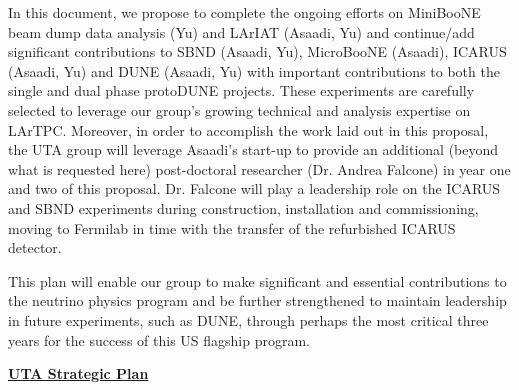In this document, we propose to complete the ongoing efforts on MiniBooNE beam dump data analysis (Yu) and LArIAT (Asaadi, Yu) and continue/add significant contributions to SBND (Asaadi, Yu), MicroBooNE (Asaadi), ICARUS (Asaadi, Yu) and DUNE (Asaadi, Yu) with important contributions to both the single and dual phase protoDUNE projects. These experiments are carefully selected to leverage our group's growing technical and analysis expertise on LArTPC. Moreover, in order to accomplish the work laid out in this proposal, the UTA group will leverage Asaadi's start-up to provide an additional (beyond what is requested here) post-doctoral researcher (Dr. Andrea Falcone) in year one and two of this proposal. Dr. Falcone will play a leadership role on the ICARUS and SBND experiments during construction, installation and commissioning, moving to Fermilab in time with the transfer of the refurbished ICARUS detector.

This plan will enable our group to make significant and essential contributions to the neutrino physics program and be further strengthened to maintain leadership in future experiments, such as DUNE, through perhaps the most critical three years for the success of this US flagship program.

\begin{center}
\textbf{\Large\underline{UTA Strategic Plan} }\label{sec:strategic-plan}
\end{center}

